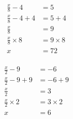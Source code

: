 \documentclass[12pt]{article}
\newcounter{minipagecount}
\begin{document}
\begin{multicols}{2}
\noindent{(\theminipagecount)}\hspace{0.1mm} %
\begin{minipage}[t]{0.45\textwidth} %
    \vspace{-26pt}  %
    \raggedright %
    \begin{align*} %
        \frac{x}{8} - 4 &= 5\\
        \frac{x}{8} - 4 + 4 &= 5 + 4\\
        \frac{x}{8} &= 9\\
        \frac{x}{8} \times8 &= 9 \times8\\
        x &= 72\\
    \end{align*}
\end{minipage} %
\noindent{(\theminipagecount)}\hspace{0.1mm} %
\begin{minipage}[t]{0.45\textwidth} %
    \vspace{-26pt}  %
    \raggedright %
    \begin{align*} %
        \frac{x}{2} - 9 &= -6\\
        \frac{x}{2} - 9 + 9 &= -6 + 9\\
        \frac{x}{2} &= 3\\
        \frac{x}{2} \times2 &= 3 \times2\\
        x &= 6\\
    \end{align*}

\end{minipage}
\end{multicols}
\end{document}
